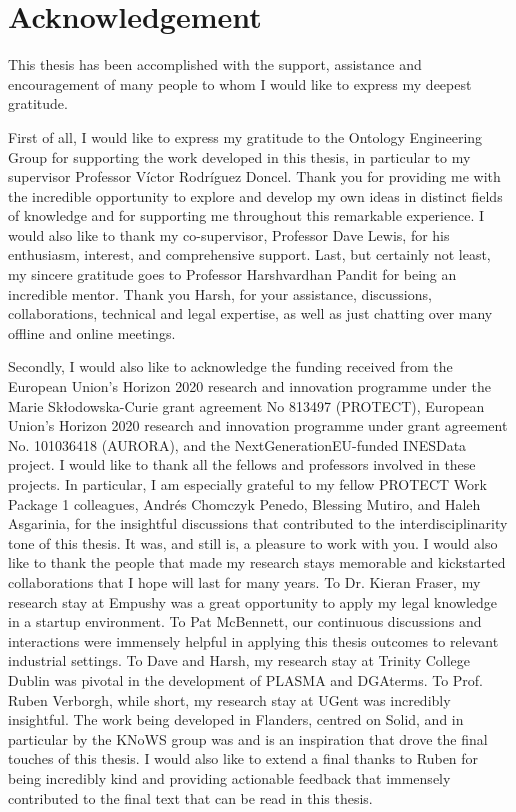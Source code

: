 %
\section*{Acknowledgement}
\label{sec::acknowledgement}

This thesis has been accomplished with the support, assistance and encouragement of many people to whom I would like to express my deepest gratitude.

First of all, I would like to express my gratitude to the Ontology Engineering Group for supporting the work developed in this thesis, in particular to my supervisor Professor Víctor Rodríguez Doncel.
Thank you for providing me with the incredible opportunity to explore and develop my own ideas in distinct fields of knowledge and for supporting me throughout this remarkable experience.
I would also like to thank my co-supervisor, Professor Dave Lewis, for his enthusiasm, interest, and comprehensive support.
Last, but certainly not least, my sincere gratitude goes to Professor Harshvardhan Pandit for being an incredible mentor.
Thank you Harsh, for your assistance, discussions, collaborations, technical and legal expertise, as well as just chatting over many offline and online meetings.

Secondly, I would also like to acknowledge the funding received from the European Union's Horizon 2020 research and innovation programme under the Marie Skłodowska-Curie grant agreement No 813497 (PROTECT), European Union’s Horizon 2020 research and innovation programme under grant agreement No. 101036418 (AURORA), and the NextGenerationEU-funded INESData project.
I would like to thank all the fellows and professors involved in these projects.
In particular, I am especially grateful to my fellow PROTECT Work Package 1 colleagues, Andrés Chomczyk Penedo, Blessing Mutiro, and Haleh Asgarinia, for the insightful discussions that contributed to the interdisciplinarity tone of this thesis.
It was, and still is, a pleasure to work with you.
I would also like to thank the people that made my research stays memorable and kickstarted collaborations that I hope will last for many years.
To Dr. Kieran Fraser, my research stay at Empushy was a great opportunity to apply my legal knowledge in a startup environment.
To Pat McBennett, our continuous discussions and interactions were immensely helpful in applying this thesis outcomes to relevant industrial settings.
To Dave and Harsh, my research stay at Trinity College Dublin was pivotal in the development of PLASMA and DGAterms.
To Prof. Ruben Verborgh, while short, my research stay at UGent was incredibly insightful.
The work being developed in Flanders, centred on Solid, and in particular by the KNoWS group was and is an inspiration that drove the final touches of this thesis.
I would also like to extend a final thanks to Ruben for being incredibly kind and providing actionable feedback that immensely contributed to the final text that can be read in this thesis.

